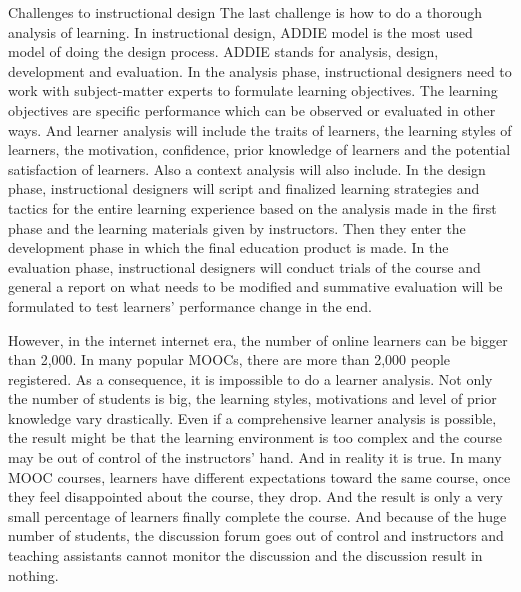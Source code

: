 \documentclass[sigconf]{acmart}
\begin{document}
Challenges to instructional design
The last challenge is how to do a thorough analysis of learning. In instructional design, ADDIE model is the most used model of doing the design process. ADDIE stands for analysis, design, development and evaluation. In the analysis phase, instructional designers need to work with subject-matter experts to formulate learning objectives. The learning objectives are specific performance which can be observed or evaluated in other ways. And learner analysis will include the traits of learners, the learning styles of learners, the motivation, confidence, prior knowledge of learners and the potential satisfaction of learners. Also a context analysis will also include. In the design phase, instructional designers will script and finalized learning strategies and tactics for the entire learning experience based on the analysis made in the first phase and the learning materials given by instructors. Then they enter the development phase in which the final education product is made. In the evaluation phase, instructional designers will conduct trials of the course and general a report on what needs to be modified and summative evaluation will be formulated to test learners' performance change in the end.

However, in the internet internet era, the number of online learners can be bigger than 2,000. In many popular MOOCs, there are more than 2,000 people registered. As a consequence, it is impossible to do a learner analysis. Not only the number of  students is big, the learning styles, motivations and level of prior knowledge vary drastically. Even if a comprehensive learner analysis is possible, the result might be that the learning environment is too complex and the course may be out of control of the instructors' hand. And in reality it is true. In many MOOC courses, learners have different expectations toward the same course, once they feel disappointed about the course, they drop. And the result is only a very small percentage of learners finally complete the course. And because of the huge number of students, the discussion forum goes out of control and instructors and teaching assistants cannot monitor the discussion and the discussion result in nothing. 
\end{document}
